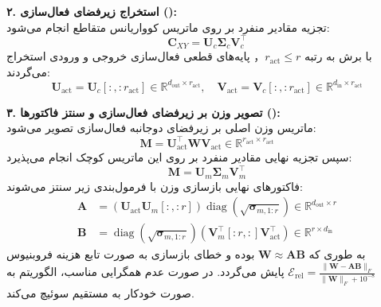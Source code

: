 \textbf{۲. استخراج زیرفضای فعال‌سازی ():} \\
تجزیه مقادیر منفرد بر روی ماتریس کوواریانس متقاطع انجام می‌شود:
\begin{equation}
\mathbf{C}_{XY} = \mathbf{U}_c \mathbf{\Sigma}_c \mathbf{V}_c^\top
\end{equation}
با برش به رتبه $r_{\text{act}} \le r$， پایه‌های قطعی فعال‌سازی خروجی و ورودی استخراج می‌گردند:
\begin{equation}
\mathbf{U}_{\text{act}} = \mathbf{U}_{c}[:, :r_{\text{act}}] \in \mathbb{R}^{d_{\text{out}} \times r_{\text{act}}}, \quad \mathbf{V}_{\text{act}} = \mathbf{V}_{c}[:, :r_{\text{act}}] \in \mathbb{R}^{d_{\text{in}} \times r_{\text{act}}}
\end{equation}

\textbf{۳. تصویر وزن بر زیرفضای فعال‌سازی و سنتز فاکتورها ():} \\
ماتریس وزن اصلی بر زیرفضای دوجانبه فعال‌سازی تصویر می‌شود:
\begin{equation}
\mathbf{M} = \mathbf{U}_{\text{act}}^\top \mathbf{W} \mathbf{V}_{\text{act}} \in \mathbb{R}^{r_{\text{act}} \times r_{\text{act}}}
\end{equation}
سپس تجزیه نهایی مقادیر منفرد بر روی این ماتریس کوچک انجام می‌پذیرد:
\begin{equation}
\mathbf{M} = \mathbf{U}_m \mathbf{\Sigma}_m \mathbf{V}_m^\top
\end{equation}
فاکتورهای نهایی بازسازی وزن با فرمول‌بندی زیر سنتز می‌شوند:
\begin{align}
\mathbf{A} &= (\mathbf{U}_{\text{act}} \mathbf{U}_m[:, :r]) \operatorname{diag}(\sqrt{\mathbf{\sigma}_{m, 1:r}}) \in \mathbb{R}^{d_{\text{out}} \times r} \\
\mathbf{B} &= \operatorname{diag}(\sqrt{\mathbf{\sigma}_{m, 1:r}}) (\mathbf{V}_m^\top[:r, :] \mathbf{V}_{\text{act}}^\top) \in \mathbb{R}^{r \times d_{\text{in}}}
\end{align}
به طوری که $\mathbf{W} \approx \mathbf{A} \mathbf{B}$ بوده و خطای بازسازی به صورت تابع هزینه فروبنیوس $\mathcal{E}_{\text{rel}} = \frac{\|\mathbf{W} - \mathbf{A}\mathbf{B}\|_F}{\|\mathbf{W}\|_F + 10^{-8}}$ پایش می‌گردد. در صورت عدم همگرایی مناسب، الگوریتم به صورت خودکار به  مستقیم سوئیچ می‌کند.


